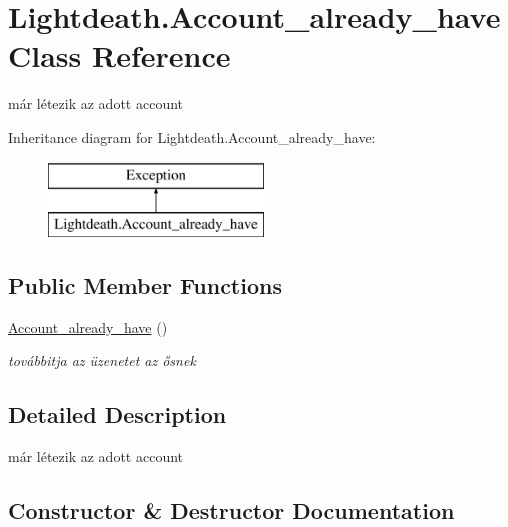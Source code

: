 \hypertarget{class_lightdeath_1_1_account__already__have}{}\section{Lightdeath.\+Account\+\_\+already\+\_\+have Class Reference}
\label{class_lightdeath_1_1_account__already__have}


már létezik az adott account  


Inheritance diagram for Lightdeath.\+Account\+\_\+already\+\_\+have\+:\begin{figure}[H]
\begin{center}
\leavevmode
\includegraphics[height=2.000000cm]{class_lightdeath_1_1_account__already__have}
\end{center}
\end{figure}
\subsection*{Public Member Functions}
\begin{DoxyCompactItemize}
\item 
\hyperlink{class_lightdeath_1_1_account__already__have_a96c6b3bc4989bde0a5d66095bd47ed59}{Account\+\_\+already\+\_\+have} ()
\begin{DoxyCompactList}\small\item\em továbbitja az üzenetet az ősnek \end{DoxyCompactList}\end{DoxyCompactItemize}


\subsection{Detailed Description}
már létezik az adott account 



\subsection{Constructor \& Destructor Documentation}
\hypertarget{class_lightdeath_1_1_account__already__have_a96c6b3bc4989bde0a5d66095bd47ed59}{}\label{class_lightdeath_1_1_account__already__have_a96c6b3bc4989bde0a5d66095bd47ed59} 
